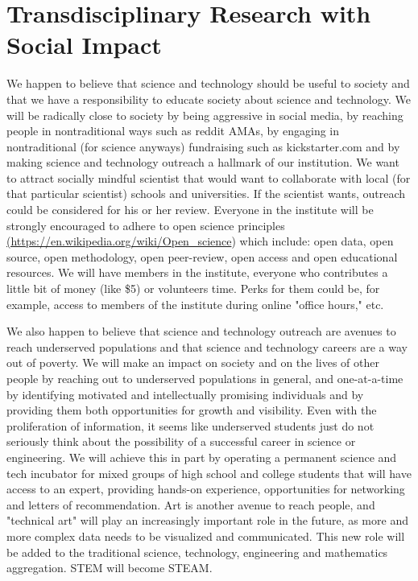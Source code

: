 \section{Transdisciplinary Research with Social Impact}

We happen to believe that science and technology should be useful to society and that we have a responsibility to educate society about science and technology. We will be radically close to society by being aggressive in social media, by reaching people in nontraditional ways such as reddit AMAs, by engaging in nontraditional (for science anyways) fundraising such as kickstarter.com and by making science and technology outreach a hallmark of our institution. We want to attract socially mindful scientist that would want to collaborate with local (for that particular scientist) schools and universities. If the scientist wants, outreach could be considered for his or her review. Everyone in the institute will be strongly encouraged to adhere to open science principles \url{(https://en.wikipedia.org/wiki/Open_science}) which include: open data, open source, open methodology, open peer-review, open access and open educational resources. We will have members in the institute, everyone who contributes a little bit of money (like \$5) or volunteers time. Perks for them could be, for example, access to members of the institute during online "office hours," etc. 

We also happen to believe that science and technology outreach are avenues to reach underserved populations and that science and technology careers are a way out of poverty. We will make an impact on society and on the lives of other people by reaching out to underserved populations in general, and one-at-a-time by identifying motivated and intellectually promising individuals and by providing them both opportunities for growth and visibility. Even with the proliferation of information, it seems like underserved students just do not seriously think about the possibility of a successful career in science or engineering. We will achieve this in part by operating a permanent science and tech incubator for mixed groups of high school and college students that will have access to an expert, providing hands-on experience, opportunities for networking and letters of recommendation. Art is another avenue to reach people, and "technical art" will play an increasingly important role in the future, as more and more complex data needs to be visualized and communicated. This new role will be added to the traditional science, technology, engineering and mathematics aggregation. STEM will become STEAM.

